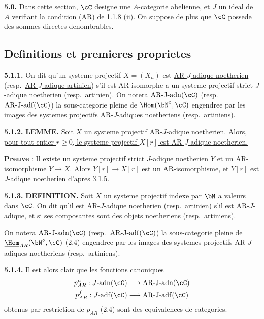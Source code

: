 \medskip
\noindent\textbf{5.0.} Dans cette section, $\cC$ designe une $A$-categorie abelienne, et $J$ un ideal de $A$ verifiant la condition (AR) de 1.1.8 (ii). On suppose de plus que $\cC$ possede des sommes directes denombrables.

\subsection{Definitions et premieres proprietes}

\medskip
\noindent\textbf{5.1.1.} On dit qu'un systeme projectif $X = (X_n)$ est \underline{AR-$J$-adique noetherien} (resp.\ \underline{AR-$J$-adique artinien}) s'il est AR-isomorphe a un systeme projectif strict $J$-adique noetherien (resp.\ artinien). On notera $\mathrm{AR\text{-}J\text{-}adn}(\cC)$ (resp.\ $\mathrm{AR\text{-}J\text{-}adf}(\cC)$) la sous-categorie pleine de $\Hom(\bN^\circ, \cC)$ engendree par les images des systemes projectifs AR-$J$-adiques noetheriens (resp.\ artiniens).

\medskip
\noindent\textbf{5.1.2.} \textbf{LEMME.} \underline{Soit $X$ un systeme projectif AR-$J$-adique noetherien. Alors, pour tout entier $r \geq 0$, le systeme projectif $X[r]$ est AR-$J$-adique noetherien.}

\textbf{Preuve} : Il existe un systeme projectif strict $J$-adique noetherien $Y$ et un AR-isomorphisme $Y \longrightarrow X$. Alors $Y[r] \longrightarrow X[r]$ est un AR-isomorphisme, et $Y[r]$ est $J$-adique noetherien d'apres 3.1.5.

\medskip
\noindent\textbf{5.1.3.} \textbf{DEFINITION.} \underline{Soit $X$ un systeme projectif indexe par $\bN$ a valeurs dans $\cC$. On dit qu'il est AR-$J$-adique noetherien (resp.\ artinien) s'il est AR-$J$-adique, et si ses composantes sont des objets noetheriens (resp.\ artiniens).}

On notera $\mathrm{AR\text{-}J\text{-}adn}(\cC)$ (resp.\ $\mathrm{AR\text{-}J\text{-}adf}(\cC)$) la sous-categorie pleine de $\underline{\Hom}_{AR}(\bN^\circ, \cC)$ (2.4) engendree par les images des systemes projectifs AR-$J$-adiques noetheriens (resp.\ artiniens).

\medskip
\noindent\textbf{5.1.4.} Il est alors clair que les fonctions canoniques
\begin{align*}
p_{AR}^n : J\text{-}\mathrm{adn}(\cC) &\longrightarrow \mathrm{AR\text{-}J\text{-}adn}(\cC) \\
p_{AR}^f : J\text{-}\mathrm{adf}(\cC) &\longrightarrow \mathrm{AR\text{-}J\text{-}adf}(\cC)
\end{align*}
obtenus par restriction de $p_{AR}$ (2.4) sont des equivalences de categories.

